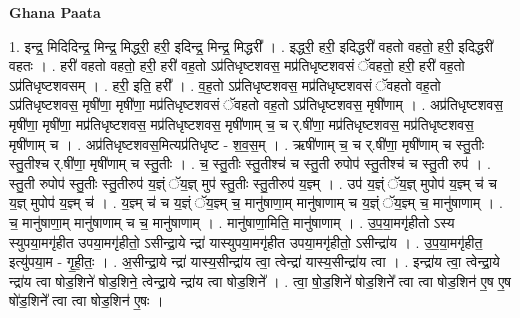 \documentclass[17pt]{extarticle}
\begin{document}
\textbf{Ghana Paata } \newline

1. इन्द्र॒ मिदिदिन्द्र॒ मिन्द्र॒ मिद्धरी॒ हरी॒ इदिन्द्र॒ मिन्द्र॒ मिद्धरी᳚ । . इद्धरी॒ हरी॒ इदिद्धरी॑ वहतो वहतो॒ हरी॒ इदिद्धरी॑ वहतः । . हरी॑ वहतो वहतो॒ हरी॒ हरी॑ वह॒तो ऽप्र॑तिधृष्टशवस॒ मप्र॑तिधृष्टशवसं ॅवहतो॒ हरी॒ हरी॑ वह॒तो ऽप्र॑तिधृष्टशवसम् । . हरी॒ इति॒ हरी᳚ । . व॒ह॒तो ऽप्र॑तिधृष्टशवस॒ मप्र॑तिधृष्टशवसं ॅवहतो वह॒तो ऽप्र॑तिधृष्टशवस॒ मृषी॑णा॒ मृषी॑णा॒ मप्र॑तिधृष्टशवसं ॅवहतो वह॒तो ऽप्र॑तिधृष्टशवस॒ मृषी॑णाम् । . अप्र॑तिधृष्टशवस॒ मृषी॑णा॒ मृषी॑णा॒ मप्र॑तिधृष्टशवस॒ मप्र॑तिधृष्टशवस॒ मृषी॑णाम् च॒ च र्.षी॑णा॒ मप्र॑तिधृष्टशवस॒ मप्र॑तिधृष्टशवस॒ मृषी॑णाम् च । . अप्र॑तिधृष्टशवस॒मित्यप्र॑तिधृष्ट - श॒व॒स॒म् । . ऋषी॑णाम् च॒ च र्.षी॑णा॒ मृषी॑णाम् च स्तु॒तीः स्तु॒तीश्च र्.षी॑णा॒ मृषी॑णाम् च स्तु॒तीः । . च॒ स्तु॒तीः स्तु॒तीश्च॑ च स्तु॒ती रुपोप॑ स्तु॒तीश्च॑ च स्तु॒ती रुप॑ । . स्तु॒ती रुपोप॑ स्तु॒तीः स्तु॒तीरुप॑ य॒ज्ञ्ं ॅय॒ज्ञ् मुप॑ स्तु॒तीः स्तु॒तीरुप॑ य॒ज्ञ्म् । . उप॑ य॒ज्ञ्ं ॅय॒ज्ञ् मुपोप॑ य॒ज्ञ्म् च॑ च य॒ज्ञ् मुपोप॑ य॒ज्ञ्म् च॑ । . य॒ज्ञ्म् च॑ च य॒ज्ञ्ं ॅय॒ज्ञ्म् च॒ मानु॑षाणा॒म् मानु॑षाणाम् च य॒ज्ञ्ं ॅय॒ज्ञ्म् च॒ मानु॑षाणाम् । . च॒ मानु॑षाणा॒म् मानु॑षाणाम् च च॒ मानु॑षाणाम् । . मानु॑षाणा॒मिति॒ मानु॑षाणाम् । . उ॒प॒या॒मगृ॑हीतो ऽस्य स्युपया॒मगृ॑हीत उपया॒मगृ॑हीतो॒ ऽसीन्द्रा॒ये न्द्रा॑ यास्युपया॒मगृ॑हीत उपया॒मगृ॑हीतो॒ ऽसीन्द्रा॑य । . उ॒प॒या॒मगृ॑हीत॒ इत्यु॑पया॒म - गृ॒ही॒तः॒ । . अ॒सीन्द्रा॒ये न्द्रा॑ यास्य॒सीन्द्रा॑य त्वा॒ त्वेन्द्रा॑ यास्य॒सीन्द्रा॑य त्वा । . इन्द्रा॑य त्वा॒ त्वेन्द्रा॒ये न्द्रा॑य त्वा षोड॒शिने॑ षोड॒शिने॒ त्वेन्द्रा॒ये न्द्रा॑य त्वा षोड॒शिने᳚ । . त्वा॒ षो॒ड॒शिने॑ षोड॒शिने᳚ त्वा त्वा षोड॒शिन॑ ए॒ष ए॒ष षो॑ड॒शिने᳚ त्वा त्वा षोड॒शिन॑ ए॒षः । \newline
\end{document}
